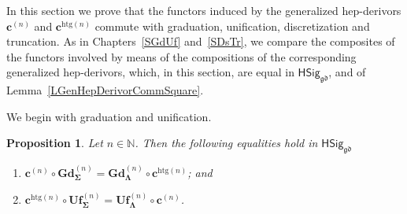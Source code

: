 \documentclass[a4paper, reqno]{amsbook}
\newcommand{\sig}[1]{\mathbf{#1}}             %
\newcommand{\gd}{\mathfrak{gd}}              %
\newcommand{\htg}{\mathrm{htg}}                %
\newcommand{\bGd}{\mathbf{Gd}}
\newcommand{\bUf}{\mathbf{Uf}}
\theoremstyle{plain}
\newtheorem{proposition}[theorem]{Proposition}
\theoremstyle{definition}
\begin{document}
In this section we prove that the functors induced by the generalized hep-derivors $\mathbf{c}^{(n)}$ and $\mathbf{c}^{\htg(n)}$ commute with graduation, unification, discretization and truncation.
As in Chapters~\ref{SGdUf} and~\ref{SDsTr}, we compare the composites of the functors involved by means of the compositions of the corresponding generalized hep-derivors, which, in this section, are equal in $\mathsf{HSig}_{\gd}$, and of Lemma~\ref{LGenHepDerivorCommSquare}.

We begin with graduation and unification.

\begin{proposition}\label{PChangeSigGdUf}
Let $n\in\mathbb{N}$.
Then the following equalities hold in $\mathsf{HSig}_{\gd}$
\begin{enumerate}
	\item
	$\mathbf{c}^{(n)}\circ\bGd^{(n)}_{\sig{\Sigma}}=\bGd^{(n)}_{\sig{\Lambda}}\circ\mathbf{c}^{\htg(n)}$; and

	\item
	$\mathbf{c}^{\htg(n)}\circ\bUf^{(n)}_{\sig{\Sigma}}=\bUf^{(n)}_{\sig{\Lambda}}\circ\mathbf{c}^{(n)}$.
\end{enumerate}
\end{proposition}
\end{document}
